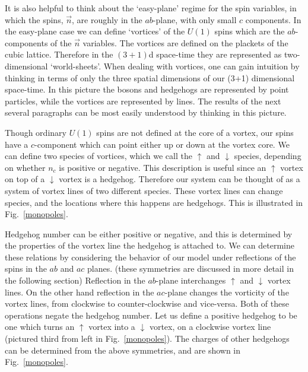 \documentclass[prb,twocolumn]{revtex4-1}
\begin{document}
It is also helpful to think about the `easy-plane' regime for the spin variables, in which the spins, $\vec{n}$, are roughly in the $ab$-plane, with only small $c$ components. In the easy-plane case we can define `vortices' of the $U(1)$ spins which are the $ab$-components of the $\vec n$ variables. 
The vortices are defined on the plackets of the cubic lattice. Therefore in the $(3+1)$d space-time they are represented as two-dimensional `world-sheets'. When dealing with vortices, one can gain intuition by thinking in terms of only the three spatial dimensions of our (3+1) dimensional space-time. In this picture the bosons and hedgehogs are represented by point particles, while the vortices are represented by lines. The results of the next several paragraphs can be most easily understood by thinking in this picture.

Though ordinary $U(1)$ spins are not defined at the core of a vortex, our spins have a $c$-component which can point either up or down at the vortex core. We can define two species of vortices, which we call the $\uparrow$ and $\downarrow$ species, depending on whether $n_c$ is positive or negative. This description is useful since an $\uparrow$ vortex on top of a $\downarrow$ vortex is a hedgehog. Therefore our system can be thought of as a system of vortex lines of two different species. These vortex lines can change species, and the locations where this happens are hedgehogs. This is illustrated in Fig.~\ref{monopoles}.

Hedgehog number can be either positive or negative, and this is determined by the properties of the vortex line the hedgehog is attached to. 
We can determine these relations by considering the behavior of our model under reflections of the spins in the $ab$ and $ac$ planes. (these symmetries are discussed in more detail in the following section)
Reflection in the $ab$-plane interchanges $\uparrow$ and $\downarrow$ vortex lines. On the other hand reflection in the $ac$-plane changes the vorticity of the vortex lines, from clockwise to counter-clockwise and vice-versa. Both of these operations negate the hedgehog number.
Let us define a positive hedgehog to be one which turns an $\uparrow$ vortex into a $\downarrow$ vortex, on a clockwise vortex line (pictured third from left in Fig.~\ref{monopoles}). The charges of other hedgehogs can be determined from the above symmetries, and are shown in Fig.~\ref{monopoles}. 
\end{document}
